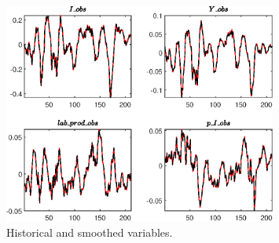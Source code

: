  
\begin{figure}[H]
\centering 
\includegraphics[width=0.80\textwidth]{BRS_est_shopping/graphs/BRS_est_shopping_HistoricalAndSmoothedVariables1}
\caption{Historical and smoothed variables.}\label{Fig:HistoricalAndSmoothedVariables:1}
\end{figure}


